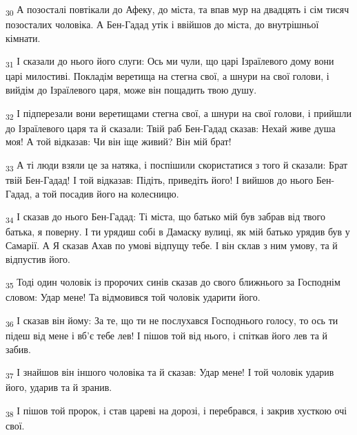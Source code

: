 \begin{tcolorbox}
\textsubscript{30} А позосталі повтікали до Афеку, до міста, та впав мур на двадцять і сім тисяч позосталих чоловіка. А Бен-Гадад утік і ввійшов до міста, до внутрішньої кімнати.
\end{tcolorbox}
\begin{tcolorbox}
\textsubscript{31} І сказали до нього його слуги: Ось ми чули, що царі Ізраїлевого дому вони царі милостиві. Покладім веретища на стегна свої, а шнури на свої голови, і вийдім до Ізраїлевого царя, може він пощадить твою душу.
\end{tcolorbox}
\begin{tcolorbox}
\textsubscript{32} І підперезали вони веретищами стегна свої, а шнури на свої голови, і прийшли до Ізраїлевого царя та й сказали: Твій раб Бен-Гадад сказав: Нехай живе душа моя! А той відказав: Чи він іще живий? Він мій брат!
\end{tcolorbox}
\begin{tcolorbox}
\textsubscript{33} А ті люди взяли це за натяка, і поспішили скористатися з того й сказали: Брат твій Бен-Гадад! І той відказав: Підіть, приведіть його! І вийшов до нього Бен-Гадад, а той посадив його на колесницю.
\end{tcolorbox}
\begin{tcolorbox}
\textsubscript{34} І сказав до нього Бен-Гадад: Ті міста, що батько мій був забрав від твого батька, я поверну. І ти урядиш собі в Дамаску вулиці, як мій батько урядив був у Самарії. А Я сказав Ахав по умові відпущу тебе. І він склав з ним умову, та й відпустив його.
\end{tcolorbox}
\begin{tcolorbox}
\textsubscript{35} Тоді один чоловік із пророчих синів сказав до свого ближнього за Господнім словом: Удар мене! Та відмовився той чоловік ударити його.
\end{tcolorbox}
\begin{tcolorbox}
\textsubscript{36} І сказав він йому: За те, що ти не послухався Господнього голосу, то ось ти підеш від мене і вб'є тебе лев! І пішов той від нього, і спіткав його лев та й забив.
\end{tcolorbox}
\begin{tcolorbox}
\textsubscript{37} І знайшов він іншого чоловіка та й сказав: Удар мене! І той чоловік ударив його, ударив та й зранив.
\end{tcolorbox}
\begin{tcolorbox}
\textsubscript{38} І пішов той пророк, і став цареві на дорозі, і перебрався, і закрив хусткою очі свої.
\end{tcolorbox}
